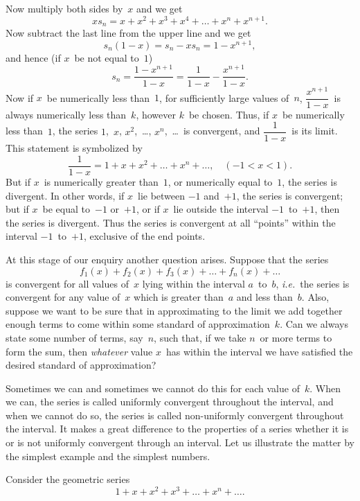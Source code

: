 \documentclass[12pt,leqno]{book}[2005/09/16]
\newcommand{\Chg}[2]{#2}
\newcommand{\Add}[1]{\Chg{}{#1}}
\newcommand{\PageSep}[1]{\ignorespaces}
\newcommand{\ie}{\emph{i.e.}}
\begin{document}
Now multiply both sides by~$x$ and we get
\[
xs_{n} = x + x^{2} + x^{3} + x^{4} + \dots + x^{n} + x^{n+1}\Add{.}
\]
Now subtract the last line from the upper
line and we get
\[
s_{n}(1 - x) = s_{n} - xs_{n} = 1 - x^{n+1},
\]
and hence (if $x$~be not equal to~$1$)
\[
s_{n} = \frac{1 - x^{n+1}}{1 - x}
  = \frac{1}{1 - x} - \frac{x^{n+1}}{1 - x}\Add{.}
\]
Now if $x$~be numerically less than~$1$, for sufficiently
large values of~$n$, $\dfrac{x^{n+1}}{1 - x}$~is always numerically
\PageSep{207}
less than~$k$, however $k$~be chosen. Thus,
if $x$~be numerically less than~$1$, the series $1$,~$x$,
$x^{2}$,~\dots\Add{,} $x^{n}$,~\dots\ is convergent, and $\dfrac{1}{1 - x}$~is its
limit. This statement is symbolized by
\[
\frac{1}{1 - x} = 1 + x + x^{2} + \dots + x^{n} + \dots,\quad
(-1 < x < 1).
\]
But if $x$~is numerically greater than~$1$, or
numerically equal to~$1$, the series is divergent.
In other words, if $x$~lie between $-1$ and~$+1$,
the series is convergent; but if $x$~be equal
to~$-1$ or~$+1$, or if $x$~lie outside the interval
$-1$~to~$+1$, then the series is divergent. Thus
the series is convergent at all ``points''
within the interval $-1$~to~$+1$, exclusive of
the end points.

At this stage of our enquiry another question
arises. Suppose that the series
\[
f_{1}(x) + f_{2}(x) + f_{3}(x) + \dots + f_{n}(x) + \dots
\]
is convergent for all values of~$x$ lying within
the interval $a$~to~$b$, \ie~the series is convergent
for any value of~$x$ which is greater than~$a$ and
less than~$b$. Also, suppose we want to be
sure that in approximating to the limit we
add together enough terms to come within
some standard of approximation~$k$. Can we
always state some number of terms, say~$n$,
such that, if we take $n$~or more terms to
form the sum, then \emph{whatever} value $x$~has
\PageSep{208}
within the interval we have satisfied the
desired standard of approximation?

Sometimes we can and sometimes we cannot
%
%
do this for each value of~$k$. When we
can, the series is called uniformly convergent
throughout the interval, and when we cannot
do so, the series is called non-uniformly convergent
throughout the interval. It makes
a great difference to the properties of a series
whether it is or is not uniformly convergent
through an interval. Let us illustrate the
matter by the simplest example and the
simplest numbers.

Consider the geometric series
\[
1 + x + x^{2} + x^{3} + \dots + x^{n} + \dots\Add{.}
\]
\end{document}
